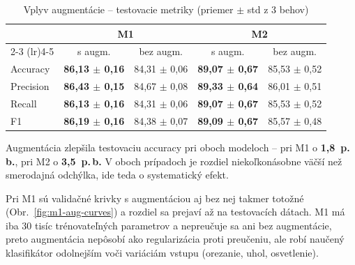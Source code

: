 \begin{table}[H]
    \centering
    \caption{Vplyv augmentácie -- testovacie metriky (priemer $\pm$ std z 3 behov)}
    \label{tab:aug-table}
    \footnotesize
    \begin{tabular}{lcccc}
        \toprule
         & \multicolumn{2}{c}{M1} & \multicolumn{2}{c}{M2} \\
        \cmidrule(lr){2-3} \cmidrule(lr){4-5}
         & s augm. & bez augm. & s augm. & bez augm. \\
        \midrule
        Accuracy  & \textbf{86,13 $\pm$ 0,16} & 84,31 $\pm$ 0,06 & \textbf{89,07 $\pm$ 0,67} & 85,53 $\pm$ 0,52 \\
        Precision & \textbf{86,43 $\pm$ 0,15} & 84,67 $\pm$ 0,08 & \textbf{89,33 $\pm$ 0,64} & 86,01 $\pm$ 0,51 \\
        Recall    & \textbf{86,13 $\pm$ 0,16} & 84,31 $\pm$ 0,06 & \textbf{89,07 $\pm$ 0,67} & 85,53 $\pm$ 0,52 \\
        F1        & \textbf{86,19 $\pm$ 0,16} & 84,38 $\pm$ 0,07 & \textbf{89,09 $\pm$ 0,67} & 85,57 $\pm$ 0,48 \\
        \bottomrule
    \end{tabular}
\end{table}

Augmentácia zlepšila testovaciu accuracy pri oboch modeloch -- pri M1
o \textbf{1,8~p.\,b.}, pri M2 o \textbf{3,5~p.\,b.} V oboch prípadoch je rozdiel
niekoľkonásobne väčší než smerodajná odchýlka, ide teda o systematický efekt.





Pri M1 sú validačné krivky s augmentáciou aj bez nej takmer totožné
(Obr.~\ref{fig:m1-aug-curves}) a rozdiel sa prejaví až na testovacích dátach.
M1 má iba 30 tisíc trénovateľných parametrov a nepreučuje sa ani bez
augmentácie, preto augmentácia nepôsobí ako regularizácia proti preučeniu,
ale robí naučený klasifikátor odolnejším voči variáciám vstupu (orezanie,
uhol, osvetlenie).

